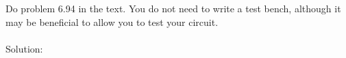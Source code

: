 Do problem 6.94 in the text.  You do not need to write a test bench, although it may be beneficial to allow you to test your circuit.\\ \\

Solution: \\ \\
\lstset{language=VHDL}

